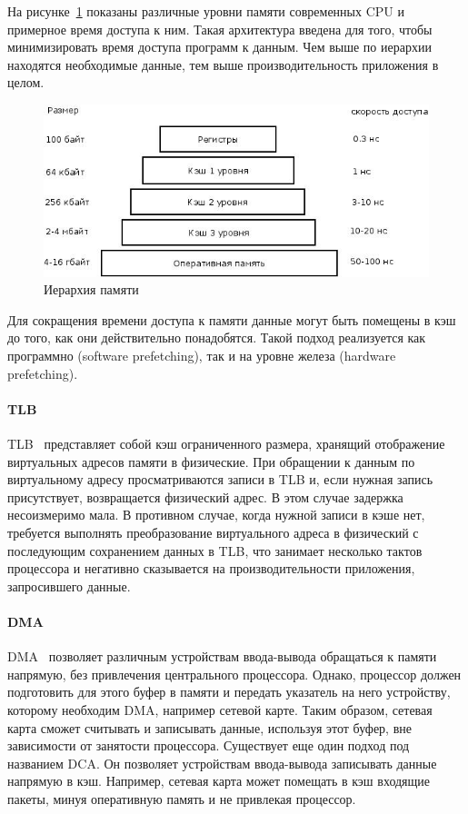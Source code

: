 На рисунке~\ref{pic:memory_schema} показаны различные уровни памяти современных CPU и примерное время доступа к ним. Такая архитектура введена для того, чтобы минимизировать время доступа программ к данным. Чем выше по иерархии находятся необходимые данные, тем выше производительность приложения в целом.
\begin{figure}
\centering
\includegraphics[scale=0.7]{pictures/memory_schema}
\caption{Иерархия памяти}
\label{pic:memory_schema}
\end{figure}

Для сокращения времени доступа к памяти данные могут быть помещены в кэш до того, как они действительно понадобятся. Такой подход реализуется как программно (software prefetching), так и на уровне железа (hardware prefetching).

\paragraph{TLB}

TLB~\cite{modern_os} представляет собой кэш ограниченного размера, хранящий отображение виртуальных адресов памяти в физические. При обращении к данным по виртуальному адресу просматриваются записи в TLB и, если нужная запись присутствует, возвращается физический адрес. В этом случае задержка несоизмеримо мала. В противном случае, когда нужной записи в кэше нет, требуется выполнять преобразование виртуального адреса в физический с последующим сохранением данных в TLB, что занимает несколько тактов процессора и негативно сказывается на производительности приложения, запросившего данные.

\paragraph{DMA}

DMA~\cite{modern_os} позволяет различным устройствам ввода-вывода обращаться к памяти напрямую, без привлечения центрального процессора. Однако, процессор должен подготовить для этого буфер в памяти и передать указатель на него устройству, которому необходим DMA, например сетевой карте. Таким образом, сетевая карта сможет считывать и записывать данные, используя этот буфер, вне зависимости от занятости процессора. Существует еще один подход под названием DCA. Он позволяет устройствам ввода-вывода записывать данные напрямую в кэш. Например, сетевая карта может помещать в кэш входящие пакеты, минуя оперативную память и не привлекая процессор.

